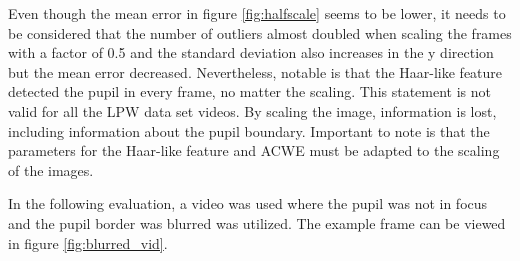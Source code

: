 Even though the mean error in figure \ref{fig:halfscale} seems to be lower, it needs to be considered that the number of outliers almost doubled when scaling the frames with a factor of 0.5 and the standard deviation also increases in the y direction but the mean error decreased. Nevertheless,  notable is that the Haar-like feature detected the pupil in every frame, no matter the scaling. This statement is not valid for all the LPW data set videos. By scaling the image, information is lost, including information about the pupil boundary. Important to note is that the parameters for the Haar-like feature and ACWE must be adapted to the scaling of the images. 

In the following evaluation, a video was used where the pupil was not in focus and the pupil border was blurred was utilized. The example frame can be viewed in figure \ref{fig:blurred_vid}.

